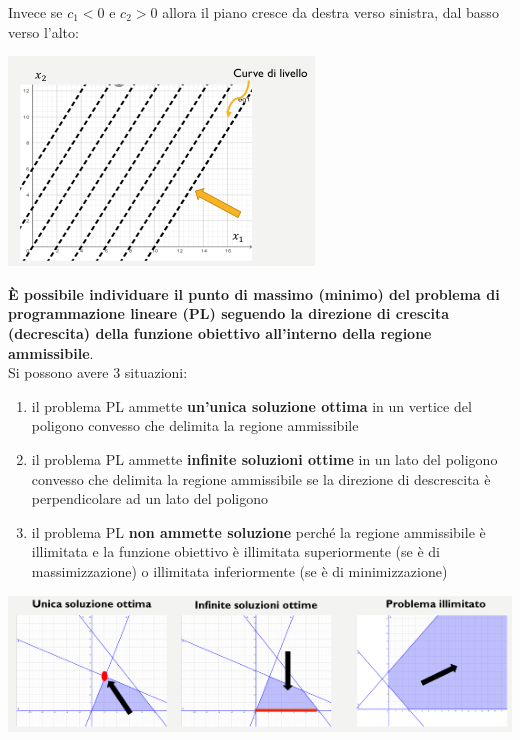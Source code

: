\documentclass[a4paper,12pt, oneside]{book}
\begin{document}
Invece se $c_1<0$ e $c_2>0$ allora il piano cresce da destra verso
sinistra, dal basso verso l’alto:
\begin{center}
  \includegraphics[scale = 0.7]{img/3d4.png}
\end{center}
\textbf{È possibile individuare il punto di massimo (minimo) del
  problema di programmazione lineare (PL) seguendo la direzione di crescita
  (decrescita) della funzione obiettivo all’interno della regione
  ammissibile}.\\
Si possono avere 3 situazioni:
\begin{enumerate}
  \item il problema PL ammette \textbf{un’unica soluzione ottima} in un
  vertice del poligono convesso che delimita la regione ammissibile
  \item il problema PL ammette \textbf{ infinite soluzioni ottime} in
  un lato del poligono convesso che delimita la regione ammissibile
  se la direzione di descrescita è perpendicolare ad un lato del
  poligono
  \item il problema PL \textbf{non ammette soluzione} perché la
  regione   ammissibile è illimitata e la funzione obiettivo
  è illimitata superiormente (se è di massimizzazione) o
  illimitata inferiormente (se è di minimizzazione)
\end{enumerate}
\begin{center}
  \includegraphics[scale = 0.7]{img/3d5.png}
\end{center}
\end{document}
